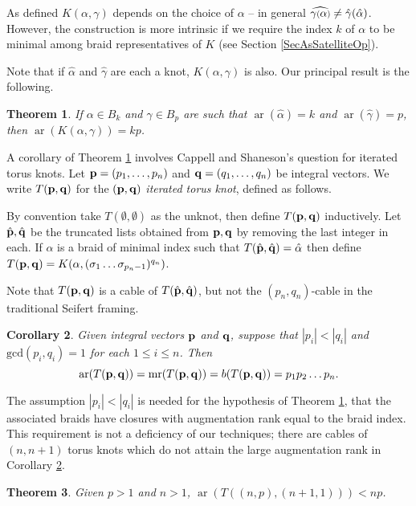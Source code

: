 \documentclass[11pt]{amsart}
\def\s{{\sigma}}
\def\ar{\operatorname{ar}}
\def\mr{\operatorname{mr}}
\newcommand*{\smallp}[1]{\scalebox{.75}{\ensuremath#1}}
\newtheorem{thm}{Theorem}[section]
\newtheorem{cor}[thm]{Corollary}
\theoremstyle{definition}
\begin{document}
As defined $K(\alpha,\gamma)$ depends on the choice of $\alpha$ {--} in general $\widehat{\gamma\smallp(\alpha\smallp)} \ne \hat{\gamma}(\hat{\alpha})$. However, the construction is more intrinsic if we require the index $k$ of $\alpha$ to be minimal among braid representatives of $K$ (see Section \ref{SecAsSatelliteOp}). 

Note that if $\hat{\alpha}$ and $\hat{\gamma}$ are each a knot, $K(\alpha,\gamma)$ is also. Our principal result is the following.

\begin{thm}\label{main}
If $\alpha\in B_k$ and $\gamma\in B_p$ are such that $\ar(\hat{\alpha})=k$ and $\ar(\hat{\gamma})=p$, then $\ar(K(\alpha,\gamma))=kp$.
\end{thm}

A corollary of Theorem \ref{main} involves Cappell and Shaneson's question for iterated torus knots. Let ${\bf p}=(p_1,\ldots,p_n)$ and ${\bf q}=(q_1,\ldots,q_n)$ be integral vectors. We write $T({\bf p},{\bf q})$ for the $({\bf p},{\bf q})$ \emph{iterated torus knot}, defined as follows. 

By convention take $T(\emptyset,\emptyset)$ as the unknot, then define $T({\bf p},{\bf q})$ inductively. Let $\hat{\bf p}, \hat{\bf q}$ be the truncated lists obtained from ${\bf p},{\bf q}$ by removing the last integer in each. If $\alpha$ is a braid of minimal index such that $T(\hat{\bf p},\hat{\bf q}) = \hat{\alpha}$ then define $T({\bf p},{\bf q}) = K(\alpha,(\s_1\ldots\s_{p_n-1})^{q_n})$. 

Note that $T({\bf p},{\bf q})$ is a cable of $T(\hat{\bf p},\hat{\bf q})$, but not the $(p_n,q_n)$-cable in the traditional Seifert framing.

\begin{cor}\label{cor:iteratedCables}
Given integral vectors ${\bf p}$ and ${\bf q}$, suppose that $|p_i|<|q_i|$ and $\text{gcd}(p_i,q_i)=1$ for each $1\le i\le n$. Then 
      \[\ar(T({\bf p},{\bf q}))=\mr(T({\bf p},{\bf q})) = b(T({\bf p},{\bf q}))=p_1p_2\ldots p_n.\]
\end{cor}

The assumption $|p_i|<|q_i|$ is needed for the hypothesis of Theorem \ref{main}, that the associated braids have closures with augmentation rank equal to the braid index. This requirement is not a deficiency of our techniques; there are cables of $(n,n+1)$ torus knots which do not attain the large augmentation rank in Corollary \ref{cor:iteratedCables}.

\begin{thm}\label{ThmNNPlus1}Given $p>1$ and $n>1$, $\ar(T((n,p),(n+1,1))) < np$.
\end{thm}
\end{document}
